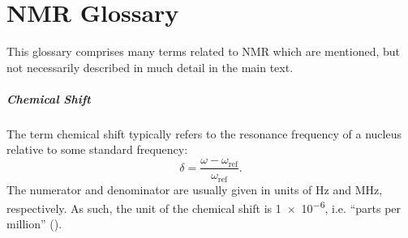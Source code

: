 \chapter{\acs{NMR} Glossary}
\label{chap:nmr-glossary}

This glossary comprises many terms related to \ac{NMR} which are mentioned, but
not necessarily described in much detail in the main text.


\paragraph{Chemical Shift} The term chemical shift typically refers to the
resonance frequency of a nucleus relative to some standard frequency:
\begin{equation}
    \delta = \frac{\omega - \omega_{\text{ref}}}{\omega_{\text{ref}}}.
\end{equation}
The numerator and denominator are usually given in units of \unit{\hertz} and
\unit{\mega\hertz}, respectively. As such, the unit of the chemical shift is
\num{1e-6}, i.e. ``parts per million'' (\unit{\partspermillion}).
